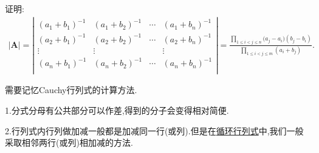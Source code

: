 \documentclass[../../main.tex]{subfiles}
\begin{document}
\begin{proposition}\label{Cauchy行列式}
证明:
\begin{gather}
|\boldsymbol{A}|=\left| \begin{matrix}
(a_1+b_1)^{-1}&		(a_1+b_2)^{-1}&		\cdots&		(a_1+b_n)^{-1}\\
(a_2+b_1)^{-1}&		(a_2+b_2)^{-1}&		\cdots&		(a_2+b_n)^{-1}\\
\vdots&		\vdots&		&		\vdots\\
(a_n+b_1)^{-1}&		(a_n+b_2)^{-1}&		\cdots&		(a_n+b_n)^{-1}\\
\end{matrix} \right|=\frac{\prod\limits_{1\le i<j\le n}{(a_j}-a_i)(b_j-b_i)}{\prod\limits_{1\leqslant i<j\leqslant m}{\left( a_i+b_j \right)}}.
\nonumber
\end{gather}
\end{proposition}
\begin{note}
需要记忆Cauchy行列式的计算方法.

1.分式分母有公共部分可以作差,得到的分子会变得相对简便.

2.行列式内行列做加减一般都是加减同一行(或列).但是在\hyperlink{循环行列式}{循环行列式}中,我们一般采取相邻两行(或列)相加减的方法.
\end{note}
\end{document}
